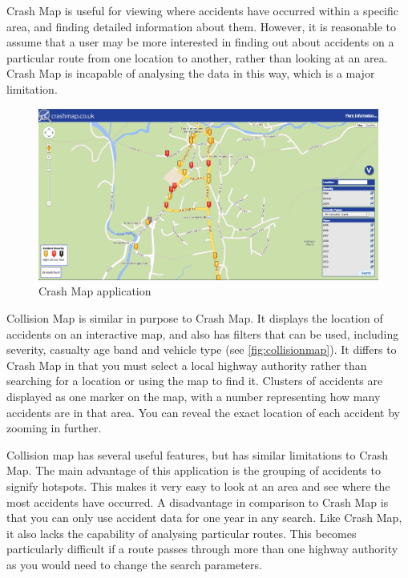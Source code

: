 \documentclass[authoryearcitations]{UoYCSproject}
\begin{document}
Crash Map is useful for viewing where accidents have occurred within a specific area, and finding detailed information about them. However, it is reasonable to assume that a user may be more interested in finding out about accidents on a particular route from one location to another, rather than looking at an area. Crash Map is incapable of analysing the data in this way, which is a major limitation.

\begin{figure}
	\includegraphics[scale=0.3]{crashmap}
	\caption{Crash Map application}
	\label{fig:crashmap}
\end{figure}

Collision Map \citep{DepartmentforTransport} is similar in purpose to Crash Map. It displays the location of accidents on an interactive map, and also has filters that can be used, including severity, casualty age band and vehicle type (see \autoref{fig:collisionmap}). It differs to Crash Map in that you must select a local highway authority rather than searching for a location or using the map to find it. Clusters of accidents are displayed as one marker on the map, with a number representing how many accidents are in that area. You can reveal the exact location of each accident by zooming in further.

Collision map has several useful features, but has similar limitations to Crash Map. The main advantage of this application is the grouping of accidents to signify hotspots. This makes it very easy to look at an area and see where the most accidents have occurred. A disadvantage in comparison to Crash Map is that you can only use accident data for one year in any search. Like Crash Map, it also lacks the capability of analysing particular routes. This becomes particularly difficult if a route passes through more than one highway authority as you would need to change the search parameters. 
\end{document}
